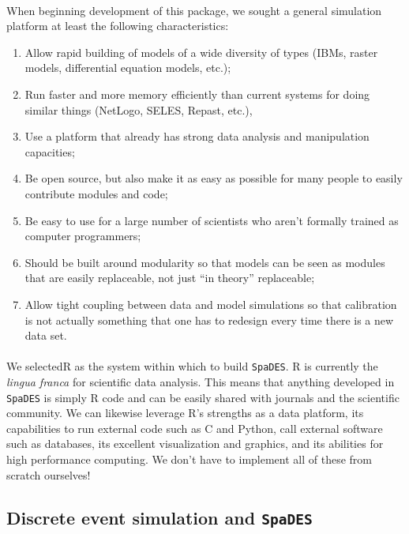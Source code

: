 \documentclass{article}
\begin{document}
\paragraph{}
When beginning development of this package, we sought a general simulation platform at least the following characteristics:

\begin{enumerate}
  \item Allow rapid building of models of a wide diversity of types (IBMs, raster models, differential equation models, etc.);
  \item Run faster and more memory efficiently than current systems for doing similar things (NetLogo, SELES, Repast, etc.),
  \item Use a platform that already has strong data analysis and manipulation capacities;
  \item Be open source, but also make it as easy as possible for many people to easily contribute modules and code;
  \item Be easy to use for a large number of scientists who aren't formally trained as computer programmers;
  \item Should be built around modularity so that models can be seen as modules that are easily replaceable, not just ``in theory'' replaceable;
  \item Allow tight coupling between data and model simulations so that calibration is not actually something that one has to redesign every time there is a new data set.
\end{enumerate}

\paragraph{}
We selected\textsf{R} as the system within which to build \texttt{SpaDES}. \textsf{R} is currently the \textit{lingua franca} for scientific data analysis. This means that anything developed in \texttt{SpaDES} is simply \textsf{R} code and can be easily shared with journals and the scientific community. We can likewise leverage \textsf{R}'s strengths as a data platform, its capabilities to run external code such as C and Python, call external software such as databases, its excellent visualization and graphics, and its abilities for high performance computing. We don't have to implement all of these from scratch ourselves!

\subsection{Discrete event simulation and \texttt{SpaDES}}
\end{document}
